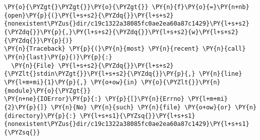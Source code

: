 \begin{Verbatim}[commandchars=\\\{\}]
\PY{o}{\PYZgt{}\PYZgt{}}\PY{o}{\PYZgt{}} \PY{n}{f}\PY{o}{=}\PY{n+nb}{open}\PY{p}{(}\PY{l+s+s2}{\PYZdq{}}\PY{l+s+s2}{nonexistent\PYZus{}dir/c19c1322a38085fc0ae2ea60a87c1429}\PY{l+s+s2}{\PYZdq{}}\PY{p}{,}\PY{l+s+s2}{\PYZdq{}}\PY{l+s+s2}{w}\PY{l+s+s2}{\PYZdq{}}\PY{p}{)}
\PY{n}{Traceback} \PY{p}{(}\PY{n}{most} \PY{n}{recent} \PY{n}{call} \PY{n}{last}\PY{p}{)}\PY{p}{:}
  \PY{n}{File} \PY{l+s+s2}{\PYZdq{}}\PY{l+s+s2}{\PYZlt{}stdin\PYZgt{}}\PY{l+s+s2}{\PYZdq{}}\PY{p}{,} \PY{n}{line} \PY{l+m+mi}{1}\PY{p}{,} \PY{o+ow}{in} \PY{o}{\PYZlt{}}\PY{n}{module}\PY{o}{\PYZgt{}}
\PY{n+ne}{IOError}\PY{p}{:} \PY{p}{[}\PY{n}{Errno} \PY{l+m+mi}{2}\PY{p}{]} \PY{n}{No} \PY{n}{such} \PY{n}{file} \PY{o+ow}{or} \PY{n}{directory}\PY{p}{:} \PY{l+s+s1}{\PYZsq{}}\PY{l+s+s1}{nonexistent\PYZus{}dir/c19c1322a38085fc0ae2ea60a87c1429}\PY{l+s+s1}{\PYZsq{}}
\end{Verbatim}

